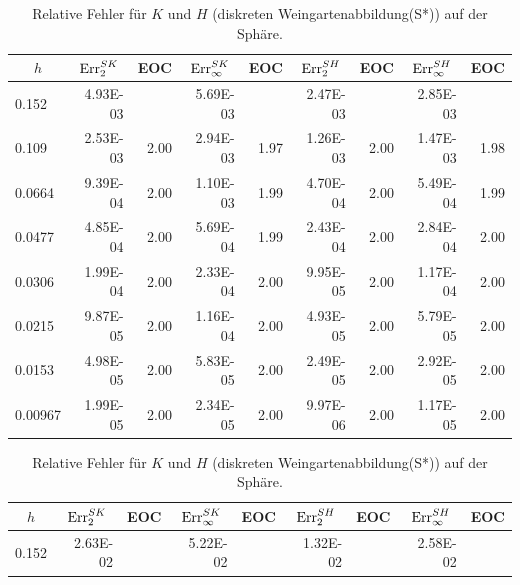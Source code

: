    \begin{table}[htbp]
      \begin{tabular}{|l|r|r|r|r|r|r|r|r|}
      \hline
      \multicolumn{1}{|c|}{\rule{0pt}{11pt}\( h \)} & \multicolumn{1}{c|}{\( \text{Err}_{2}^{SK} \)} & \multicolumn{1}{c|}{EOC} & 
           \multicolumn{1}{c|}{\( \text{Err}_{\infty}^{SK} \)} & \multicolumn{1}{c|}{EOC} & \multicolumn{1}{c|}{\( \text{Err}_{2}^{SH} \)} &
           \multicolumn{1}{c|}{EOC} & \multicolumn{1}{c|}{\( \text{Err}_{\infty}^{SH} \)} & \multicolumn{1}{c|}{EOC} \\ \hline
      0.152 & 4.93E-03 & \multicolumn{1}{l|}{} & 5.69E-03 & \multicolumn{1}{l|}{} & 2.47E-03 & \multicolumn{1}{l|}{} & 2.85E-03 & \multicolumn{1}{l|}{} \\ \hline
      0.109 & 2.53E-03 & 2.00 & 2.94E-03 & 1.97 & 1.26E-03 & 2.00 & 1.47E-03 & 1.98 \\ \hline
      0.0664 & 9.39E-04 & 2.00 & 1.10E-03 & 1.99 & 4.70E-04 & 2.00 & 5.49E-04 & 1.99 \\ \hline
      0.0477 & 4.85E-04 & 2.00 & 5.69E-04 & 1.99 & 2.43E-04 & 2.00 & 2.84E-04 & 2.00 \\ \hline
      0.0306 & 1.99E-04 & 2.00 & 2.33E-04 & 2.00 & 9.95E-05 & 2.00 & 1.17E-04 & 2.00 \\ \hline
      0.0215 & 9.87E-05 & 2.00 & 1.16E-04 & 2.00 & 4.93E-05 & 2.00 & 5.79E-05 & 2.00 \\ \hline
      0.0153 & 4.98E-05 & 2.00 & 5.83E-05 & 2.00 & 2.49E-05 & 2.00 & 2.92E-05 & 2.00 \\ \hline
      0.00967 & 1.99E-05 & 2.00 & 2.34E-05 & 2.00 & 9.97E-06 & 2.00 & 1.17E-05 & 2.00 \\ \hline
      \end{tabular}
      \caption[Weingarten auf der Sphäre]{Relative Fehler für \( K \) und \( H \) (diskreten Weingartenabbildung(S*)) auf der Sphäre.}
      \label{tabSphereWeingarten}
      \vspace{10pt}
      \begin{tabular}{|l|r|r|r|r|r|r|r|r|}
      \hline
      \multicolumn{1}{|c|}{\rule{0pt}{11pt}\( h \)} & \multicolumn{1}{c|}{\( \text{Err}_{2}^{SK} \)} & \multicolumn{1}{c|}{EOC} & 
           \multicolumn{1}{c|}{\( \text{Err}_{\infty}^{SK} \)} & \multicolumn{1}{c|}{EOC} & \multicolumn{1}{c|}{\( \text{Err}_{2}^{SH} \)} &
           \multicolumn{1}{c|}{EOC} & \multicolumn{1}{c|}{\( \text{Err}_{\infty}^{SH} \)} & \multicolumn{1}{c|}{EOC} \\ \hline
           0.152 & 2.63E-02 & \multicolumn{1}{l|}{} & 5.22E-02 & \multicolumn{1}{l|}{} & 1.32E-02 & \multicolumn{1}{l|}{} & 2.58E-02 & \multicolumn{1}{l|}{} \\ \hline

\end{tabular}
\end{table}
